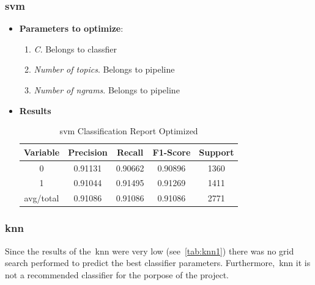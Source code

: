 \subsubsection{\acl{svm}}
\begin{itemize}
	\item \textbf{Parameters to optimize}:
	\begin{enumerate}
		\item \textit{C}. Belongs to classfier
		\item \textit{Number of topics}. Belongs to pipeline
		\item \textit{Number of ngrams}. Belongs to pipeline
		
	\end{enumerate}
	\item \textbf{Results}
	\begin{table}[h!]
		\centering
		\begin{tabular}{||c c c c c||} 
			\hline
			Variable & Precision & Recall & F1-Score & Support \\ [0.5ex] 
			\hline\hline
			0 & 0.91131 & 0.90662 & 0.90896 & 1360 \\ 
			1 & 0.91044 & 0.91495 & 0.91269 & 1411 \\
			avg/total & 0.91086 & 0.91086 & 0.91086 & 2771 \\
			[1ex] 
			\hline
		\end{tabular}
		\caption{\acl{svm} Classification Report Optimized}
		\label{tab:sv2}
	\end{table}
	
\end{itemize}
\subsubsection{\acl{knn}}
Since the results of the~\ac{knn} were very low (see~\cref{tab:knn1}) there was no grid search performed to predict the best classifier parameters. Furthermore,~\ac{knn} it is not a recommended classifier for the porpose of the project.
